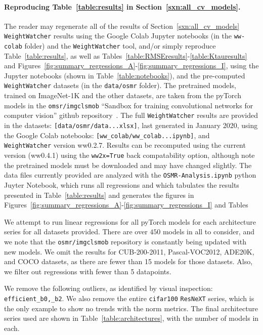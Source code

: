 \paragraph{Reproducing Table~\ref{table:results} in Section~\ref{sxn:all_cv_models}. }

The reader may regenerate all of the  results of Section~\ref{sxn:all_cv_models} 
\texttt{WeightWatcher} results using the Google Colab Jupyter notebooks (in the \texttt{ww-colab} folder)
and  the \texttt{WeightWatcher} tool, 
and/or simply reproduce 
Table~\ref{table:results}, as well as Tables~\ref{table:RMSEresults}-\ref{table:Ktauresults}
and  Figures~\ref{fig:summary_regressions_A}-\ref{fig:summary_regressions_I},
using the Jupyter notebooks (shown in Table~\ref{table:notebooks}),
and the pre-computed \texttt{WeightWatcher} datasets (in the \texttt{data/osmr} folder).
The pretrained models, trained on ImageNet-1K and the other datasets, 
are taken from the pyTorch models in the \texttt{omsr/imgclsmob} 
``Sandbox for training convolutional networks for computer vision'' github repository~\cite{osmr}.
The full  \texttt{WeightWatcher} results are provided in the datasets: \texttt{[data/osmr/data...xlsx]},
last generated in January 2020, using the Google Colab notebooks: \texttt{[ww\_colab/ww\_colab...ipynb]},
and \texttt{WeightWatcher} version ww0.2.7.  Results can be recomputed using the current version (ww0.4.1)
using the \texttt{ww2x=True} back compatability option, although note the pretrained models must
be downloaded and  may have changed slightly.
The data files currently provided are analyzed with the \texttt{OSMR-Analysis.ipynb} python Juyter Notebook,
which runs all regressions and which tabulates the results presented in 
Table~\ref{table:results}
and generates the figures in Figures~\ref{fig:summary_regressions_A}-\ref{fig:summary_regressions_I}
and Tables

We attempt to run linear regressions for all pyTorch models for each architecture series for all datasets provided.  
There are over $450$ models in all to consider, and we note that the \texttt{osmr/imgclsmob} repository is constantly being updated with new models.
We omit the results for CUB-200-2011, Pascal-VOC2012, ADE20K, and COCO datasets, as there are fewer than 15 models for those datasets.  
Also, we filter out regressions with fewer than 5 datapoints.

We remove the following outliers, as identified by visual inspection: \texttt{efficient\_b0,\_b2}.
We also remove the entire \texttt{cifar100} \texttt{ResNeXT} series, which is the only example to show no trends with the norm metrics.
%
The final architecture series used are shown in  Table~\ref{table:architectures}, with the number of models in each.

